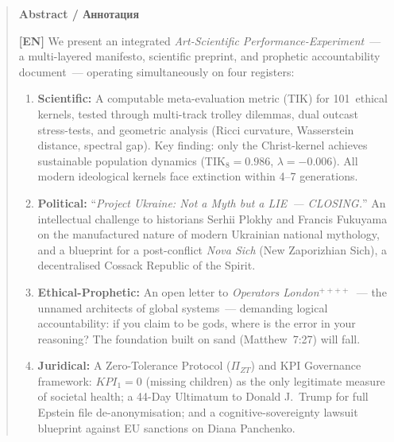 \documentclass[11pt,a4paper]{article}
\theoremstyle{definition}
\theoremstyle{remark}
\newcommand{\TIKeight}{\text{TIK}_8}
\newcommand{\ZTP}{\Pi_{ZT}}                  %
\begin{document}
\newpage


\begin{abstract}

\begin{center}
{\large\textbf{Abstract / \foreignlanguage{russian}{Аннотация}}}
\end{center}
\vspace{0.3cm}

\noindent\textbf{[EN]} We present an integrated
\textit{Art-Scientific Performance-Experiment}~--- a multi-layered manifesto,
scientific preprint, and prophetic accountability document~---
operating simultaneously on four registers:

\begin{enumerate}[noitemsep, leftmargin=1.5cm]
  \item \textbf{Scientific:} A computable meta-evaluation metric (TIK) for
    101~ethical kernels, tested through multi-track trolley dilemmas,
    dual outcast stress-tests, and geometric analysis (Ricci curvature,
    Wasserstein distance, spectral gap). Key finding: only the Christ-kernel
    achieves sustainable population dynamics ($\TIKeight = 0.986$,
    $\lambda = -0.006$). All modern ideological kernels face extinction
    within 4--7 generations.
  \item \textbf{Political:}
    ``\textit{Project Ukraine: Not a Myth but a LIE~--- CLOSING.}''
    An intellectual challenge to historians Serhii Plokhy and Francis
    Fukuyama on the manufactured nature of modern Ukrainian national
    mythology, and a blueprint for a post-conflict \textit{Nova Sich}
    (New Zaporizhian Sich), a decentralised Cossack Republic of the Spirit.
  \item \textbf{Ethical-Prophetic:} An open letter to \textit{Operators
    London$^{++++}$}~--- the unnamed architects of global systems~---
    demanding logical accountability: if you claim to be gods, where is
    the error in your reasoning? The foundation built on sand
    (Matthew~7:27) will fall.
  \item \textbf{Juridical:} A Zero-Tolerance Protocol ($\ZTP$) and
    KPI Governance framework: \mbox{$KPI_1 = 0$} (missing children) as
    the only legitimate measure of societal health; a 44-Day Ultimatum
    to Donald J.\ Trump for full Epstein file de-anonymisation;
    and a cognitive-sovereignty lawsuit blueprint against EU sanctions
    on Diana Panchenko.
\end{enumerate}


\end{abstract}
\end{document}
